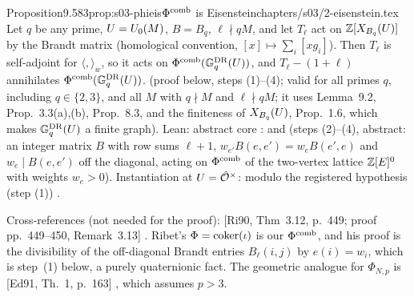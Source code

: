 \begin{quoted}{Proposition}{9.5}{83}{prop:s03-phieis}{$\Phi^{\mathrm{comb}}$ is Eisenstein}{chapters/s03/2-eisenstein.tex}\label{rpt:prop:s03-phieis}
Let $q$ be any prime, $U=U_0(M)$, $B=B_q$, $\ell\nmid qM$, and let $T_\ell$ act on $\mathbb{Z}[X_{B_q}(U)]$ by the Brandt matrix (homological
convention, $[x]\mapsto\sum_i[xg_i]$). Then $T_\ell$ is self-adjoint for $\langle,\rangle_w$, so it acts on $\Phi^{\mathrm{comb}}(\mathbb{G}^{\mathrm{DR}}_q(U))$, and
$T_\ell-(1+\ell)$ annihilates $\Phi^{\mathrm{comb}}(\mathbb{G}^{\mathrm{DR}}_q(U))$. \stproved{} (proof below, steps (1)--(4); valid for all primes $q$, including $q\in\{2,3\}$, and all
$M$ with $q\nmid M$ and $\ell\nmid qM$; it uses Lemma~9.2, Prop.~3.3(a),(b), Prop.~8.3, and the
finiteness of $X_{B_q}(U)$, Prop.~1.6, which makes $\mathbb{G}^{\mathrm{DR}}_q(U)$ a finite graph). Lean: abstract core \stformal{}:  and  (steps (2)--(4), abstract: an integer matrix $B$ with row sums $\ell+1$,
$w_{e'}B(e,e')=w_eB(e',e)$ and $w_e\mid B(e,e')$ off the diagonal, acting on $\Phi^{\mathrm{comb}}$ of the two-vertex lattice $\mathbb{Z}[E]^0$ with weights $w_e>0$). Instantiation at $U=\hat{\mathcal{O}}^\times$:  \stformal{} modulo the registered hypothesis (step (1)) .

Cross-references (not needed for the proof): [Ri90, Thm~3.12, p.~449; proof pp.~449--450, Remark~3.13] \stcited{}
\cite[Thm 3.12, p.~449]{Ri90}. Ribet's $\Phi=\operatorname{coker}(\iota)$ is our
$\Phi^{\mathrm{comb}}$, and his proof is the divisibility of the off-diagonal Brandt entries $B_\ell(i,j)$ by $e(i)=w_i$, which is step~(1) below, a purely quaternionic
fact. The geometric analogue for $\Phi_{N,p}$ is [Ed91, Th.~1, p.~163] \stcited{}
\cite[Edixhoven, Th\'eor\`eme~1, p.~163]{Ed91}, which assumes $p>3$.
\end{quoted}
